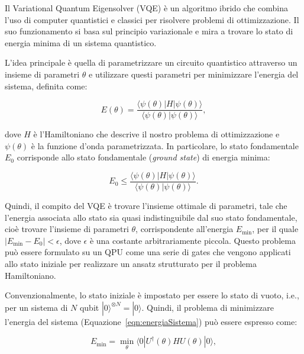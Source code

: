 Il Variational Quantum Eigensolver (VQE) è un algoritmo ibrido che combina l'uso di 
computer quantistici e classici per risolvere problemi di ottimizzazione. Il suo 
funzionamento si basa sul principio variazionale e mira a trovare lo stato di energia 
minima di un sistema quantistico.

L'idea principale è quella di parametrizzare un circuito quantistico attraverso un 
insieme di parametri $\theta$ e utilizzare questi parametri per minimizzare l'energia 
del sistema, definita come:

\begin{equation}\label{eqn:energiaSistema}
    E(\theta) = \frac{
                    \langle\psi(\theta)|H|\psi(\theta)\rangle
                }
                {
                    \langle\psi(\theta)|\psi(\theta)\rangle
                },
\end{equation}

dove $H$ è l'Hamiltoniano che descrive il nostro problema di ottimizzazione e 
$\psi(\theta)$ è la funzione d'onda parametrizzata. In particolare, lo stato 
fondamentale $E_0$ corrisponde allo stato fondamentale (\textit{ground state}) 
di energia minima: 

\begin{equation}
    E_0 \le \frac{
                    \langle\psi(\theta)|H|\psi(\theta)\rangle
                }
                {
                    \langle\psi(\theta)|\psi(\theta)\rangle
                }.
\end{equation}

Quindi, il compito del VQE è trovare l'insieme ottimale di parametri, tale che 
l'energia associata allo stato sia quasi indistinguibile dal suo stato fondamentale, 
cioè trovare l'insieme di parametri $\theta$, corrispondente all'energia $E_{\min}$, 
per il quale $|E_{\min} - E_0| < \epsilon$, dove $\epsilon$ è una costante 
arbitrariamente piccola. Questo problema può essere formulato su un QPU 
come una serie di gates che vengono applicati allo stato iniziale 
per realizzare un ansatz strutturato per il problema Hamiltoniano. 

Convenzionalmente, lo stato iniziale è impostato per essere lo stato di vuoto, i.e., 
per un sistema di $N$ qubit $|0\rangle^{\otimes N} = |0\rangle$. 
Quindi, il problema di minimizzare l'energia del sistema (Equazione~\ref{eqn:energiaSistema}) 
può essere espresso come:

\begin{equation}
    E_{\min} = \min_{\theta} \langle 0|U^{\dagger}(\theta)HU(\theta)|0\rangle,
\end{equation}

